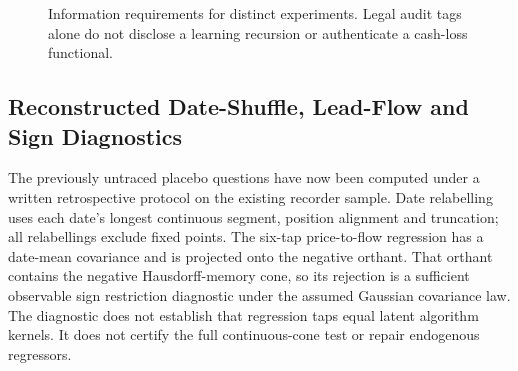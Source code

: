 \documentclass[12pt]{article}
\theoremstyle{definition}
\theoremstyle{remark}
\begin{document}
\begin{figure}[htbp]\centering
{}
\caption{Information requirements for distinct experiments. Legal audit tags alone do not disclose a learning recursion or authenticate a cash-loss functional.}
\label{fig:surveillance_contracts}\end{figure}

\subsection{Reconstructed Date-Shuffle, Lead-Flow and Sign Diagnostics}
The previously untraced placebo questions have now been computed under a written retrospective protocol on the existing recorder sample. Date relabelling uses each date's longest continuous segment, position alignment and truncation; all relabellings exclude fixed points. The six-tap price-to-flow regression has a date-mean covariance and is projected onto the negative orthant. That orthant contains the negative Hausdorff-memory cone, so its rejection is a sufficient observable sign restriction diagnostic under the assumed Gaussian covariance law. The diagnostic does not establish that regression taps equal latent algorithm kernels. It does not certify the full continuous-cone test or repair endogenous regressors.
\begin{table}[htbp]
\centering\footnotesize\setlength{\tabcolsep}{3pt}
\caption{Reconstructed recorder diagnostics: 199 fixed-point-free whole-date flow relabellings and 1,999 Gaussian vertex draws for the six-tap negative orthant. The printed ranks are simulation diagnostics at finite resolution, not randomized-treatment or finite-sample market $p$ values.}
\label{tab:falsification}
\end{table}
\end{document}
